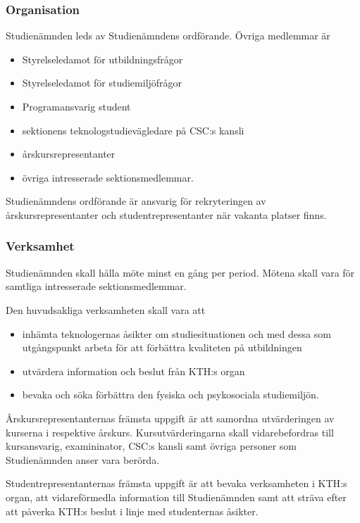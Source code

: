 \documentclass{dgovdoc}
\begin{document}
\subsubsection{Organisation}

Studienämnden leds av Studienämndens ordförande. Övriga medlemmar är

\begin{itemize}
  \item Styrelseledamot för utbildningsfrågor
  \item Styrelseledamot för studiemiljöfrågor
  \item Programansvarig student
  \item sektionens teknologstudievägledare på CSC:s kansli
  \item årskursrepresentanter
  \item övriga intresserade sektionsmedlemmar.
\end{itemize}

Studienämndens ordförande är ansvarig för rekryteringen av
årskursrepresentanter och studentrepresentanter när vakanta platser finns.

\subsubsection{Verksamhet}

Studienämnden skall hålla möte minst en gång per period. Mötena skall vara för
samtliga intresserade sektionsmedlemmar.

Den huvudsakliga verksamheten skall vara att

\begin{itemize}
  \item inhämta teknologernas åsikter om studiesituationen och med dessa som
    utgångspunkt arbeta för att förbättra kvaliteten på utbildningen
  \item utvärdera information och beslut från KTH:s organ
  \item bevaka och söka förbättra den fysiska och psykosociala studiemiljön.
\end{itemize}

Årskursrepresentanternas främsta uppgift är att samordna utvärderingen av
kurserna i respektive årskurs. Kursutvärderingarna skall vidarebefordras till
kursansvarig, examininator, CSC:s kansli samt övriga personer som Studienämnden
anser vara berörda.

Studentrepresentanternas främsta uppgift är att bevaka verksamheten i KTH:s
organ, att vidareförmedla information till Studienämnden samt att sträva efter
att påverka KTH:s beslut i linje med studenternas åsikter.
\end{document}
